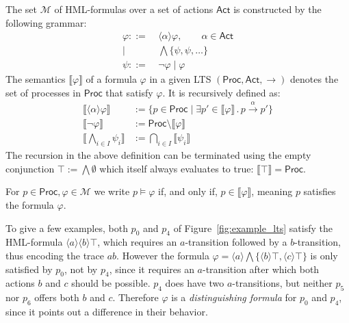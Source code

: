 \begin{definition}%
    \label{def:hml}
    The set $\mathcal{M}$ of HML-formulas over a set of actions $\mathsf{Act}$
    is constructed by the following grammar:
    \begin{align*}
        \varphi ::=\ &\langle \alpha \rangle \varphi, \qquad \alpha \in \mathsf{Act} \\
                \mid \quad &\bigwedge \{\psi, \psi, \ldots\} \\
        \psi ::=\ &\neg \varphi \mid \varphi
    \end{align*}
    The semantics $\llbracket \varphi \rrbracket$ of a formula
    $\varphi$ in a given LTS
    $(\mathsf{Proc}, \mathsf{Act}, {\rightarrow})$ denotes the set of processes in
    $\mathsf{Proc}$ that satisfy $\varphi$.
    It is recursively defined as:
    \begin{align*}
        \llbracket \langle \alpha \rangle \varphi \rrbracket &:=
            \{p \in \mathsf{Proc} \mid
              \exists p' \in \llbracket \varphi \rrbracket\,.\,
              p \xrightarrow{\alpha} p'
            \} \\
        \llbracket \neg \varphi \rrbracket &:=
            \mathsf{Proc} \setminus \llbracket \varphi \rrbracket \\
        \llbracket \bigwedge_{i \in I} \psi_i \rrbracket &:=
            \bigcap_{i \in I} \llbracket \psi_i \rrbracket
    \end{align*}
    The recursion in the above definition can be terminated using the empty
    conjunction $\top := \bigwedge \emptyset$
    which itself always evaluates to true:
    $\llbracket \top \rrbracket = \mathsf{Proc}$.

    For $p \in \mathsf{Proc}, \varphi \in \mathcal{M}$
    we write $p \models \varphi$ if, and only if,
    $p \in \llbracket \varphi \rrbracket$,
    meaning $p$ satisfies the formula $\varphi$.
\end{definition}

To give a few examples,
both $p_0$ and $p_4$ of Figure~\ref{fig:example_lts} satisfy the HML-formula
$\langle a \rangle \langle b \rangle \top$,
which requires an $a$-transition followed by a $b$-transition,
thus encoding the trace $ab$.
However the formula
$\varphi = \langle a \rangle \bigwedge \{
    \langle b \rangle \top, \langle c \rangle \top \}$
is only satisfied by $p_0$, not by $p_4$,
since it requires an $a$-transition
after which both actions $b$ and $c$ should be possible.
$p_4$ does have two $a$-transitions,
but neither $p_5$ nor $p_6$ offers both $b$ and $c$.
Therefore $\varphi$ is a \emph{distinguishing formula} for $p_0$ and $p_4$,
since it points out a difference in their behavior.


